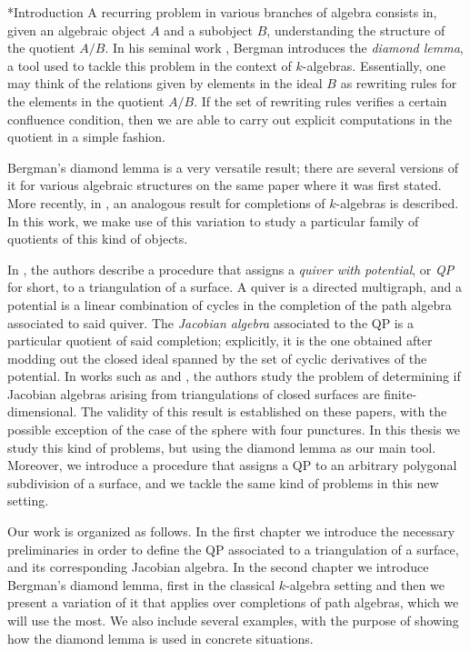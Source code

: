 \begin{chapter}*{Introduction}
A recurring problem in various branches of algebra consists in, given an algebraic object $A$ and a subobject $B$, understanding the structure of the quotient $A/B$. In his seminal work \cite{Ber78}, Bergman introduces the \emph{diamond lemma}, a tool used to tackle this problem in the context of $k$-algebras. Essentially, one may think of the relations given by elements in the ideal $B$ as rewriting rules for the elements in the quotient $A/B$. If the set of rewriting rules verifies a certain confluence condition, then we are able to carry out explicit computations in the quotient in a simple fashion.

Bergman's diamond lemma is a very versatile result; there are several versions of it for various algebraic structures on the same paper where it was first stated. More recently, in \cite{SAV15}, an analogous result for completions of $k$-algebras is described. In this work, we make use of this variation to study a particular family of quotients of this kind of objects.

In \cite{DWZ08}, the authors describe a procedure that assigns a \emph{quiver with potential}, or \emph{QP} for short, to a triangulation of a surface. A quiver is a directed multigraph, and a potential is a linear combination of cycles in the completion of the path algebra associated to said quiver. The \emph{Jacobian algebra} associated to the QP is a particular quotient of said completion; explicitly, it is the one obtained after modding out the closed ideal spanned by the set of cyclic derivatives of the potential. In works such as \cite{Lad12} and \cite{TVD12}, the authors study the problem of determining if Jacobian algebras arising from triangulations of closed surfaces are finite-dimensional. The validity of this result is established on these papers, with the possible exception of the case of the sphere with four punctures. In this thesis we study this kind of problems, but using the diamond lemma as our main tool. Moreover, we introduce a procedure that assigns a QP to an arbitrary polygonal subdivision of a surface, and we tackle the same kind of problems in this new setting.

Our work is organized as follows. In the first chapter we introduce the necessary preliminaries in order to define the QP associated to a triangulation of a surface, and its corresponding Jacobian algebra. In the second chapter we introduce Bergman's diamond lemma, first in the classical $k$-algebra setting and then we present a variation of it that applies over completions of path algebras, which we will use the most. We also include several examples, with the purpose of showing how the diamond lemma is used in concrete situations.


\end{chapter}
